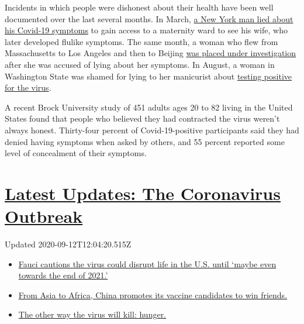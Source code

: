 Incidents in which people were dishonest about their health have been
well documented over the last several months. In March,
\href{https://www.democratandchronicle.com/story/news/2020/03/31/rochester-ny-hospitals-tighten-visitor-policy-dad-hides-covid-19-symptoms-strong-highland/5085892002/}{a
New York man lied about his Covid-19 symptoms} to gain access to a
maternity ward to see his wife, who later developed flulike symptoms.
The same month, a woman who flew from Massachusetts to Los Angeles and
then to Beijing
\href{https://www.latimes.com/world-nation/story/2020-03-18/woman-who-flew-from-u-s-to-china-for-coronavirus-test-faces-criminal-charges}{was
placed under investigation} after she was accused of lying about her
symptoms. In August, a woman in Washington State was shamed for lying to
her manicurist about
\href{https://www.allure.com/story/nail-client-exposes-manicurist-to-covid-19-virus-washington}{testing
positive for the virus}.

A recent Brock University study of 451 adults ages 20 to 82 living in
the United States found that people who believed they had contracted the
virus weren't always honest. Thirty-four percent of Covid-19-positive
participants said they had denied having symptoms when asked by others,
and 55 percent reported some level of concealment of their symptoms.

\hypertarget{latest-updates-the-coronavirus-outbreak}{%
\section{\texorpdfstring{\href{https://www.nytimes3xbfgragh.onion/2020/09/11/world/covid-19-coronavirus.html?action=click\&pgtype=Article\&state=default\&region=MAIN_CONTENT_1\&context=storylines_live_updates}{Latest
Updates: The Coronavirus
Outbreak}}{Latest Updates: The Coronavirus Outbreak}}\label{latest-updates-the-coronavirus-outbreak}}

Updated 2020-09-12T12:04:20.515Z

\begin{itemize}
\tightlist
\item
  \href{https://www.nytimes3xbfgragh.onion/2020/09/11/world/covid-19-coronavirus.html?action=click\&pgtype=Article\&state=default\&region=MAIN_CONTENT_1\&context=storylines_live_updates\#link-dfb8a16}{Fauci
  cautions the virus could disrupt life in the U.S. until `maybe even
  towards the end of 2021.'}
\item
  \href{https://www.nytimes3xbfgragh.onion/2020/09/11/world/covid-19-coronavirus.html?action=click\&pgtype=Article\&state=default\&region=MAIN_CONTENT_1\&context=storylines_live_updates\#link-7104d154}{From
  Asia to Africa, China promotes its vaccine candidates to win friends.}
\item
  \href{https://www.nytimes3xbfgragh.onion/2020/09/11/world/covid-19-coronavirus.html?action=click\&pgtype=Article\&state=default\&region=MAIN_CONTENT_1\&context=storylines_live_updates\#link-393ad215}{The
  other way the virus will kill: hunger.}
\end{itemize}

